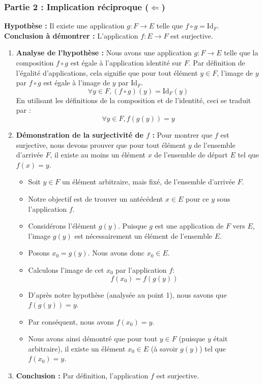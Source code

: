 \documentclass[12pt,a4paper]{report}
\providecommand{\tightlist}{%
  \setlength{\itemsep}{0pt}\setlength{\parskip}{0pt}}
\begin{document}
\subsubsection{\texorpdfstring{Partie 2 : Implication réciproque
(\(\Leftarrow\))}{Partie 2 : Implication réciproque (\textbackslash Leftarrow)}}\label{partie-2-implication-ruxe9ciproque-leftarrow}

\textbf{Hypothèse :} Il existe une application \(g: F \to E\) telle que
\(f \circ g = \text{Id}_F\). \textbf{Conclusion à démontrer :}
L'application \(f: E \to F\) est surjective.

\begin{enumerate}
\def\labelenumi{\arabic{enumi}.}
\item
  \textbf{Analyse de l'hypothèse :} Nous avons une application
  \(g: F \to E\) telle que la composition \(f \circ g\) est égale à
  l'application identité sur \(F\). Par définition de l'égalité
  d'applications, cela signifie que pour tout élément \(y \in F\),
  l'image de \(y\) par \(f \circ g\) est égale à l'image de \(y\) par
  \(\text{Id}_F\). \[
  \forall y \in F, (f \circ g)(y) = \text{Id}_F(y)
  \] En utilisant les définitions de la composition et de l'identité,
  ceci se traduit par : \[
  \forall y \in F, f(g(y)) = y
  \]
\item
  \textbf{Démonstration de la surjectivité de \(f\) :} Pour montrer que
  \(f\) est surjective, nous devons prouver que pour tout élément \(y\)
  de l'ensemble d'arrivée \(F\), il existe au moins un élément \(x\) de
  l'ensemble de départ \(E\) tel que \(f(x) = y\).

  \begin{itemize}
  \tightlist
  \item
    Soit \(y \in F\) un élément arbitraire, mais fixé, de l'ensemble
    d'arrivée \(F\).
  \item
    Notre objectif est de trouver un antécédent \(x \in E\) pour ce
    \(y\) sous l'application \(f\).
  \item
    Considérons l'élément \(g(y)\). Puisque \(g\) est une application de
    \(F\) vers \(E\), l'image \(g(y)\) est nécessairement un élément de
    l'ensemble \(E\).
  \item
    Posons \(x_0 = g(y)\). Nous avons donc \(x_0 \in E\).
  \item
    Calculons l'image de cet \(x_0\) par l'application \(f\): \[
    f(x_0) = f(g(y))
    \]
  \item
    D'après notre hypothèse (analysée au point 1), nous savons que
    \(f(g(y)) = y\).
  \item
    Par conséquent, nous avons \(f(x_0) = y\).
  \item
    Nous avons ainsi démontré que pour tout \(y \in F\) (puisque \(y\)
    était arbitraire), il existe un élément \(x_0 \in E\) (à savoir
    \(g(y)\)) tel que \(f(x_0) = y\).
  \end{itemize}
\item
  \textbf{Conclusion :} Par définition, l'application \(f\) est
  surjective.
\end{enumerate}
\end{document}
